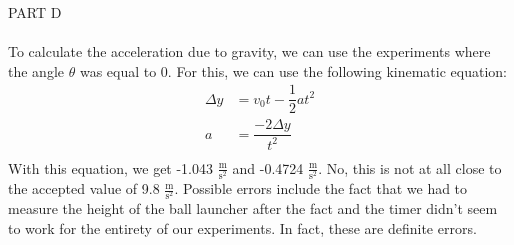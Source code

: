 \documentclass [12pt, letterpaper, twoside] {article}
\begin{document}
\noindent
PART D \\\\

\noindent
To calculate the acceleration due to gravity, we can use the experiments where the angle \(\theta\) was equal to 0\degree. For this, we can use the following kinematic equation:
\begin {equation}
  \begin {split}
    \Delta{y} & = v_{0}t-\dfrac{1}{2}at^2 \\
    a & = \dfrac{-2\Delta{y}}{t^2} \\
  \end {split}
\end {equation}
With this equation, we get -1.043 \(\tfrac{\text{m}}{\text{s}^2}\) and -0.4724 \(\tfrac{\text{m}}{\text{s}^2}\). No, this is not at all close to the accepted value of 9.8 \(\tfrac{\text{m}}{\text{s}^2}\). Possible errors include the fact that we had to measure the height of the ball launcher after the fact and the timer didn't seem to work for the entirety of our experiments. In fact, these are definite errors. \\\\ 
\end{document}
